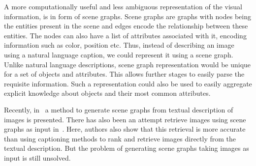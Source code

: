 A more computationally useful and less ambiguous representation of the visual
information, is in form of scene graphs.
Scene graphs are graphs with nodes being the entities present in the scene
and edges encode the relationship between these entities.
The nodes can also have a list of attributes associated with it, encoding
information such as color, position etc.
Thus, instead of describing an image using a natural language caption, we could
represent it using a scene graph.
Unlike natural language descriptions, scene graph representation would be unique
for a set of objects and attributes.
This allows further stages to easily parse the requisite information.
Such a representation could also be used to easily aggregate explicit knowledge
about objects and their most common attributes.

Recently, in~\cite{schuster2015generating} a method to generate scene graphs
from textual description of images is presented.
There has also been an attempt retrieve images using scene graphs as input
in~\cite{johnson2015image}.
Here, authors also show that this retrieval is more accurate than using
captioning methods to rank and retrieve images directly from the textual
description.
But the problem of generating scene graphs taking images as input is still
unsolved.
